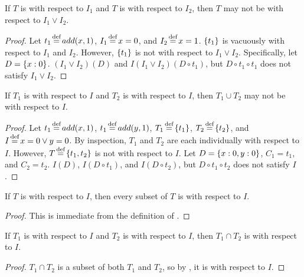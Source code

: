 \begin{claim}[disjunction]\label{clm:compose-disjunction}
  If $T$ is \iconfluent{} with respect to $I_1$ and $T$ is \iconfluent{} with
  respect to $I_2$, then $T$ may not be \iconfluent{} with respect to $I_1 \lor
  I_2$.
\end{claim}
\begin{proof}
  Let $t_1 \defeq add(x, 1)$, $I_1 \defeq x = 0$, and $I_2 \defeq x = 1$.
  $\left\{t_1\right\}$ is vacuously \iconfluent{} with respect to $I_1$ and $I_2$.
  However, $\left\{t_1\right\}$ is not \iconfluent{} with respect to $I_1 \lor I_2$.
  Specifically, let $D = \left\{x:0\right\}$. $(I_1 \lor I_2)(D)$ and $I(I_1 \lor I_2)(D
  \circ t_1)$, but $D \circ t_1 \circ t_1$ does not satisfy $I_1 \lor I_2$.
\end{proof}

\begin{claim}[union]\label{clm:compose-union}
  If $T_1$ is \iconfluent{} with respect to $I$ and $T_2$ is \iconfluent{} with
  respect to $I$, then $T_1 \cup T_2$ may not be \iconfluent{} with respect
  to $I$.
\end{claim}
\begin{proof}
  Let $t_1 \defeq add(x, 1)$, $t_1 \defeq add(y, 1)$, $T_1 \defeq \set{t_1}$,
  $T_2 \defeq \set{t_2}$, and $I \defeq x = 0 \lor y = 0$. By inspection, $T_1$
  and $T_2$ are each individually \iconfluent{} with respect to $I$. However,
  $T \defeq \set{t_1, t_2}$ is not \iconfluent{} with respect to $I$.
  Let $D = \left\{x:0,y:0\right\}$, $C_1 = t_1$, and $C_2 = t_2$. $I(D)$, $I(D \circ
  t_1)$, and $I(D \circ t_2)$, but $D \circ t_1 \circ t_2$ does not satisfy
  $I$.
\end{proof}

\begin{claim}[subset]\label{clm:compose-subset}
  If $T$ is \iconfluent{} with respect to $I$, then every subset of $T$ is
  \iconfluent{} with respect to $I$.
\end{claim}
\begin{proof}
  This is immediate from the definition of \iconfluence{}.
\end{proof}

\begin{claim}[intersection]\label{clm:compose-intersection}
  If $T_1$ is \iconfluent{} with respect to $I$ and $T_2$ is \iconfluent{} with
  respect to $I$, then $T_1 \cap T_2$ is \iconfluent{} with respect to $I$.
\end{claim}
\begin{proof}
  $T_1 \cap T_2$ is a subset of both $T_1$ and $T_2$, so by
  , it is \iconfluent{} with respect to $I$.
\end{proof}

